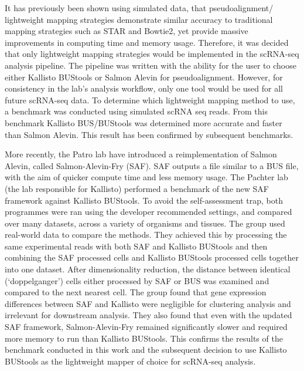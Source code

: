 It has previously been shown using simulated data, that pseudoalignment/ lightweight mapping strategies demonstrate similar accuracy to traditional mapping strategies such as STAR and Bowtie2, yet provide massive improvements in computing time and memory usage.
Therefore, it was decided that only lightweight mapping strategies would be implemented in the scRNA-seq analysis pipeline.
The pipeline was written with the ability for the user to choose either Kallisto BUStools or Salmon Alevin for pseudoalignment.
However, for consistency in the lab's analysis workflow, only one tool would be used for all future scRNA-seq data.
To determine which lightweight mapping method to use, a benchmark was conducted using simulated scRNA seq reads.
From this benchmark Kallisto BUS/BUStools was determined more accurate and faster than Salmon Alevin.
This result has been confirmed by subsequent benchmarks\cite{you2021benchmarking, melsted2019modular, melsted2019barcode}.

More recently, the Patro lab have introduced a reimplementation of Salmon Alevin, called Salmon-Alevin-Fry (SAF)\cite{sarkar2020accurate}.
SAF outputs a file similar to a BUS file, with the aim of quicker compute time and less memory usage.
The Pachter lab (the lab responsible for Kallisto) performed a benchmark of the new SAF framework against Kallisto BUStools\cite{booeshaghi2021benchmarking}.
To avoid the self-assessment trap, both programmes were ran using the developer recommended settings, and compared over many datasets, across a variety of organisms and tissues.
The group used real-world data to compare the methods.
They achieved this by processing the same experimental reads with both SAF and Kallisto BUStools and then combining the SAF processed cells and Kallisto BUStools processed cells together into one dataset.
After dimensionality reduction, the distance between identical (`doppelganger') cells either processed by SAF or BUS was examined and compared to the next nearest cell.
The group found that gene expression differences between SAF and Kallisto were negligible for clustering analysis and irrelevant for downstream analysis.
They also found that even with the updated SAF framework, Salmon-Alevin-Fry remained significantly slower and required more memory to run than Kallisto BUStools.
This confirms the results of the benchmark conducted in this work and the subsequent decision to use Kallisto BUStools as the lightweight mapper of choice for scRNA-seq analysis.

